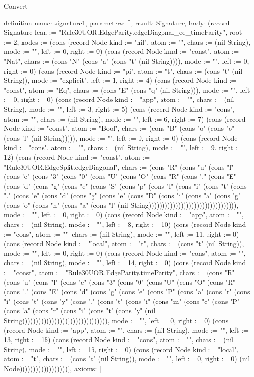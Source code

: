 \begin{lexlean}{Convert}
\begin{semanticmodule}
definition{
  name: signature1,
  parameters: [],
  result: Signature,
  body: (record Signature {lean := "Rule30UOR.EdgeParity.edgeDiagonal_eq_timeParity", root := 2, nodes := (cons (record Node {kind := "nil", atom := "", chars := (nil String), mode := "", left := 0, right := 0}) (cons (record Node {kind := "const", atom := "Nat", chars := (cons "N" (cons "a" (cons "t" (nil String)))), mode := "", left := 0, right := 0}) (cons (record Node {kind := "pi", atom := "t", chars := (cons "t" (nil String)), mode := "explicit", left := 1, right := 4}) (cons (record Node {kind := "const", atom := "Eq", chars := (cons "E" (cons "q" (nil String))), mode := "", left := 0, right := 0}) (cons (record Node {kind := "app", atom := "", chars := (nil String), mode := "", left := 3, right := 5}) (cons (record Node {kind := "cons", atom := "", chars := (nil String), mode := "", left := 6, right := 7}) (cons (record Node {kind := "const", atom := "Bool", chars := (cons "B" (cons "o" (cons "o" (cons "l" (nil String))))), mode := "", left := 0, right := 0}) (cons (record Node {kind := "cons", atom := "", chars := (nil String), mode := "", left := 9, right := 12}) (cons (record Node {kind := "const", atom := "Rule30UOR.EdgeSplit.edgeDiagonal", chars := (cons "R" (cons "u" (cons "l" (cons "e" (cons "3" (cons "0" (cons "U" (cons "O" (cons "R" (cons "." (cons "E" (cons "d" (cons "g" (cons "e" (cons "S" (cons "p" (cons "l" (cons "i" (cons "t" (cons "." (cons "e" (cons "d" (cons "g" (cons "e" (cons "D" (cons "i" (cons "a" (cons "g" (cons "o" (cons "n" (cons "a" (cons "l" (nil String))))))))))))))))))))))))))))))))), mode := "", left := 0, right := 0}) (cons (record Node {kind := "app", atom := "", chars := (nil String), mode := "", left := 8, right := 10}) (cons (record Node {kind := "cons", atom := "", chars := (nil String), mode := "", left := 11, right := 0}) (cons (record Node {kind := "local", atom := "t", chars := (cons "t" (nil String)), mode := "", left := 0, right := 0}) (cons (record Node {kind := "cons", atom := "", chars := (nil String), mode := "", left := 14, right := 0}) (cons (record Node {kind := "const", atom := "Rule30UOR.EdgeParity.timeParity", chars := (cons "R" (cons "u" (cons "l" (cons "e" (cons "3" (cons "0" (cons "U" (cons "O" (cons "R" (cons "." (cons "E" (cons "d" (cons "g" (cons "e" (cons "P" (cons "a" (cons "r" (cons "i" (cons "t" (cons "y" (cons "." (cons "t" (cons "i" (cons "m" (cons "e" (cons "P" (cons "a" (cons "r" (cons "i" (cons "t" (cons "y" (nil String)))))))))))))))))))))))))))))))), mode := "", left := 0, right := 0}) (cons (record Node {kind := "app", atom := "", chars := (nil String), mode := "", left := 13, right := 15}) (cons (record Node {kind := "cons", atom := "", chars := (nil String), mode := "", left := 16, right := 0}) (cons (record Node {kind := "local", atom := "t", chars := (cons "t" (nil String)), mode := "", left := 0, right := 0}) (nil Node))))))))))))))))))}),
  axioms: []
}


\end{semanticmodule}
\end{lexlean}
